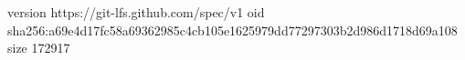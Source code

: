 version https://git-lfs.github.com/spec/v1
oid sha256:a69e4d17fc58a69362985c4cb105e1625979dd77297303b2d986d1718d69a108
size 172917

